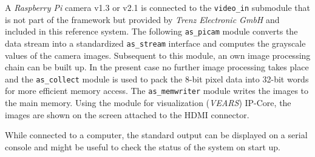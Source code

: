  A \textit{Raspberry Pi} camera v1.3 or v2.1 is connected to the \texttt{video\_in} submodule that is not part of the \asterics framework but provided by \textit{Trenz Electronic GmbH} and included in this reference system. The following \texttt{as\_picam} module converts the data stream into a standardized \texttt{as\_stream} interface and computes the grayscale values of the camera images. Subsequent to this module, an own \asterics image processing chain can be built up. In the present case no further image processing takes place and the \texttt{as\_collect} module is used to pack the 8-bit pixel data into 32-bit words for more efficient memory access. The \texttt{as\_memwriter} module writes the images to the main memory. Using the \asterics module for visualization (\textit{VEARS}) IP-Core, the images are shown on the screen attached to the HDMI connector.

 While connected to a computer, the standard output can be displayed on a serial console and might be useful to check the status of the system on start up.
